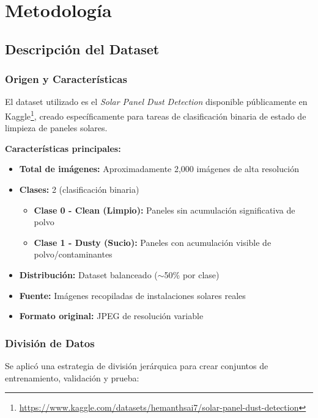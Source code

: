 \documentclass[11pt, a4paper]{article}
\begin{document}
\section{Metodología}

\subsection{Descripción del Dataset}

\subsubsection{Origen y Características}

El dataset utilizado es el \textit{Solar Panel Dust Detection} disponible públicamente en Kaggle\footnote{\url{https://www.kaggle.com/datasets/hemanthsai7/solar-panel-dust-detection}}, creado específicamente para tareas de clasificación binaria de estado de limpieza de paneles solares.

\textbf{Características principales:}

\begin{itemize}
    \item \textbf{Total de imágenes:} Aproximadamente 2,000 imágenes de alta resolución
    \item \textbf{Clases:} 2 (clasificación binaria)
    \begin{itemize}
        \item \textbf{Clase 0 - Clean (Limpio):} Paneles sin acumulación significativa de polvo
        \item \textbf{Clase 1 - Dusty (Sucio):} Paneles con acumulación visible de polvo/contaminantes
    \end{itemize}
    \item \textbf{Distribución:} Dataset balanceado ($\sim$50\% por clase)
    \item \textbf{Fuente:} Imágenes recopiladas de instalaciones solares reales
    \item \textbf{Formato original:} JPEG de resolución variable
\end{itemize}

\subsubsection{División de Datos}

Se aplicó una estrategia de división jerárquica para crear conjuntos de entrenamiento, validación y prueba:
\end{document}
